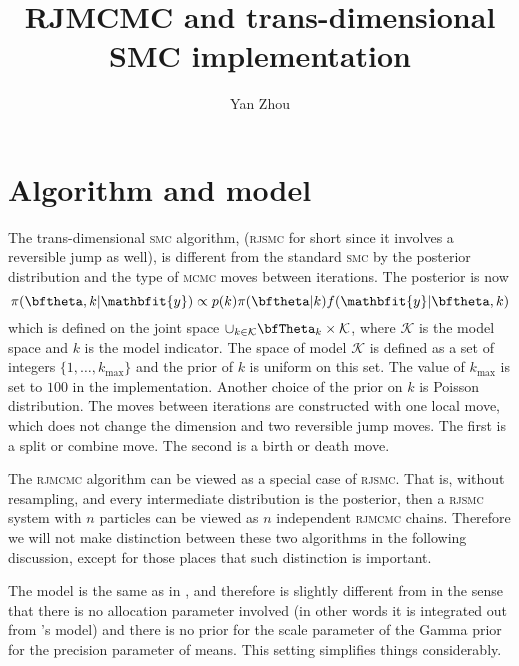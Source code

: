 \documentclass[11pt, bib, fontset = Minion]{marticle}
\def\mcmc{\textsc{mcmc}\xspace}
\def\rjmcmc{\textsc{rjmcmc}\xspace}
\def\rjsmc{\textsc{rjsmc}\xspace}
\def\smc{\textsc{smc}\xspace}
\def\by{\mathbfit{y}}
\def\K{\mathcal{K}}
\def\kmax{k_{\mathrm{max}}}
\begin{document}
  \title{RJMCMC and trans-dimensional SMC implementation}
  \author{Yan Zhou}
  \maketitle

  \section{Algorithm and model}

  The trans-dimensional \smc algorithm, (\rjsmc for short since it involves a
  reversible jump as well), is different from the standard \smc by the
  posterior distribution and the type of \mcmc moves between iterations. The
  posterior is now
  \begin{equation}
    \pi(\bftheta,k|\by) \propto p(k)\pi(\bftheta|k)f(\by|\bftheta,k)
  \end{equation}
  which is defined on the joint space $\cup_{k\in\K}\bfTheta_k\times\K$, where
  $\K$ is the model space and $k$ is the model indicator. The space of model
  $\K$ is defined as a set of integers $\{1,\dots,\kmax\}$ and the prior of
  $k$ is uniform on this set. The value of $\kmax$ is set to $100$ in the
  implementation. Another choice of the prior on $k$ is Poisson distribution.
  The moves between iterations are constructed with one local move, which does
  not change the dimension and two reversible jump moves. The first is a split
  or combine move. The second is a birth or death move.

  The \rjmcmc algorithm can be viewed as a special case of \rjsmc. That is,
  without resampling, and every intermediate distribution is the posterior,
  then a \rjsmc system with $n$ particles can be viewed as $n$ independent
  \rjmcmc chains. Therefore we will not make distinction between these two
  algorithms in the following discussion, except for those places that such
  distinction is important.

  The model is the same as in \textcite{DelMoral:2006hc}, and therefore is
  slightly different from \textcite{Richardson:1997ea} in the sense that there
  is no allocation parameter involved (in other words it is integrated out
  from \textcite{Richardson:1997ea}'s model) and there is no prior for the
  scale parameter of the Gamma prior for the precision parameter of means.
  This setting simplifies things considerably.
\end{document}
